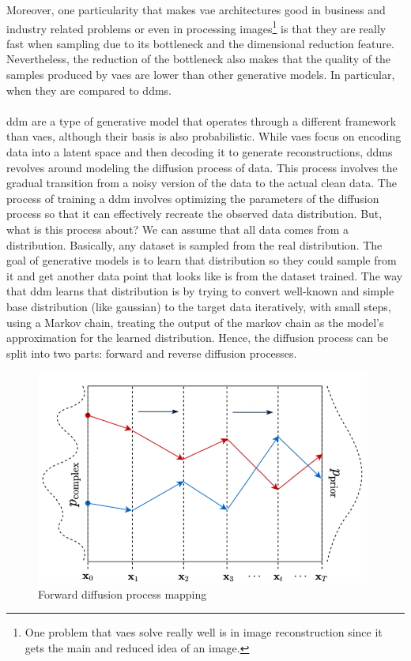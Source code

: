 \documentclass[../main.tex]{subfiles}
\begin{document}
Moreover, one particularity that makes \gls{vae} architectures good in business and industry related problems or even in processing images\footnote{One problem that \gls{vae}s solve really well is in image reconstruction since it gets the main and reduced idea of an image.} is that they are really fast when sampling due to its bottleneck and the dimensional reduction feature. Nevertheless, the reduction of the bottleneck also makes that the quality of the samples produced by \gls{vae}s are lower than other generative models. In particular, when they are compared to \gls{ddm}s.
\\
\\
\gls{ddm} \cite{ddpm} are a type of generative model that operates through a different framework than \gls{vae}s, although their basis is also probabilistic. While \gls{vae}s focus on encoding data into a latent space and then decoding it to generate reconstructions, \gls{ddm}s revolves around modeling the diffusion process of data. This process involves the gradual transition from a noisy version of the data to the actual clean data. 
The process of training a \gls{ddm} involves optimizing the parameters of the diffusion process so that it can effectively recreate the observed data distribution. But, what is this process about? 
We can assume that all data comes from a distribution. Basically, any dataset is sampled from the real distribution. The goal of generative models is to learn that distribution so they could sample from it and get another data point that looks like is from the dataset trained. The way that \gls{ddm} learns that distribution is by trying to convert well-known and simple base distribution (like gaussian) to the target data iteratively, with small steps, using a Markov chain, treating the output of the markov chain as the model's approximation for the learned distribution. Hence, the diffusion process can be split into two parts: forward and reverse diffusion processes.
\begin{figure}[H]
	\centering
	\includegraphics[width=11cm]{imgs/relatedwork/forward-diffusion-prob}
	\caption{Forward diffusion process mapping}
	\label{fig:related-forward-diffusion-prob}
\end{figure}
\end{document}
